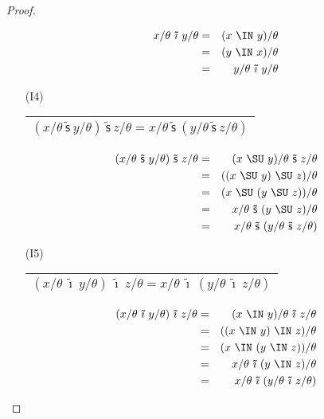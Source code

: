 \begin{proof}
\begin{multicols}{2}
\begin{enumerate}
\begin{eqnarray*}
            x/\theta \ \mathsf{\tilde{\imath}} \ y/\theta &=& (x \ \IN \ y)/\theta \\
            &=& (y \ \IN \ x)/\theta \\
            &=& y/\theta \ \mathsf{\tilde{\imath}} \ y/\theta
          \end{eqnarray*}
        \item[(I4)] \begin{tabular}{|c|} \hline $(x/\theta \ \mathsf{\tilde{s}} \ y/\theta) \ \mathsf{\tilde{s}} \
          z/\theta = x/\theta \ \mathsf{\tilde{s}} \ (y/\theta \ \mathsf{\tilde{s}} \ z/\theta)$ \\\hline \end{tabular}
          \begin{eqnarray*}
            (x/\theta \ \mathsf{\tilde{s}} \ y/\theta) \ \mathsf{\tilde{s}} \ z/\theta &=& (x \ \SU \ y)/\theta \
              \mathsf{\tilde{s}} \ z/\theta \\
            &=& ((x \ \SU \ y) \ \SU \ z) /\theta \\
            &=& (x \ \SU \ (y \ \SU \ z)) /\theta \\
            &=& x/\theta \ \mathsf{\tilde{s}} \ (y \ \SU \ z) /\theta \\
            &=& x/\theta \ \mathsf{\tilde{s}} \ (y /\theta \ \mathsf{\tilde{s}} \ z/\theta)
          \end{eqnarray*}
        \item[(I5)] \begin{tabular}{|c|} \hline $(x/\theta \ \mathsf{\tilde{\imath}} \ y/\theta) \
          \mathsf{\tilde{\imath}} \ z/\theta = x/\theta \ \mathsf{\tilde{\imath}} \ (y/\theta \ \mathsf{\tilde{\imath}}
          \ z/\theta)$ \\\hline \end{tabular}
          \begin{eqnarray*}
            (x/\theta \ \mathsf{\tilde{\imath}} \ y/\theta) \ \mathsf{\tilde{\imath}} \ z/\theta &=& (x \ \IN \
              y)/\theta \ \mathsf{\tilde{\imath}} \ z/\theta \\
            &=& ((x \ \IN \ y) \ \IN \ z) /\theta \\
            &=& (x \ \IN \ (y \ \IN \ z)) /\theta \\
            &=& x/\theta \ \mathsf{\tilde{\imath}} \ (y \ \IN \ z) /\theta \\
            &=& x/\theta \ \mathsf{\tilde{\imath}} \ (y /\theta \ \mathsf{\tilde{\imath}} \ z/\theta)
          \end{eqnarray*}

\end{enumerate}
\end{multicols}
\end{proof}
